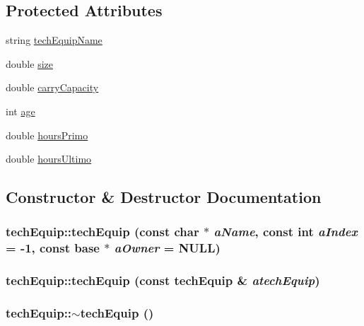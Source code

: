 \subsection*{Protected Attributes}
\begin{DoxyCompactItemize}
\item 
string \hyperlink{classtech_equip_a70f29db43df0085f1a5b8322c70e09ac}{techEquipName}
\item 
double \hyperlink{classtech_equip_a8e2d6b0d654ef641aa2bae722a926850}{size}
\item 
double \hyperlink{classtech_equip_a7abc4270ed1343782440634cc69842fc}{carryCapacity}
\item 
int \hyperlink{classtech_equip_abcca018fbc3f7fa3f12258914e1d20f7}{age}
\item 
double \hyperlink{classtech_equip_a45958baa672c3b616b5384615e7b3be8}{hoursPrimo}
\item 
double \hyperlink{classtech_equip_a33c806f6d44641789a8e919ed46e8608}{hoursUltimo}
\end{DoxyCompactItemize}


\subsection{Constructor \& Destructor Documentation}
\hypertarget{classtech_equip_abb990aaba6e93883b64ab4b60a5cf669}{
\subsubsection[{techEquip}]{\setlength{\rightskip}{0pt plus 5cm}techEquip::techEquip (const char $\ast$ {\em aName}, \/  const int {\em aIndex} = {\ttfamily -\/1}, \/  const {\bf base} $\ast$ {\em aOwner} = {\ttfamily NULL})}}
\label{classtech_equip_abb990aaba6e93883b64ab4b60a5cf669}
\hypertarget{classtech_equip_a17d3eba5034ecbb6049add3df96bf876}{
\subsubsection[{techEquip}]{\setlength{\rightskip}{0pt plus 5cm}techEquip::techEquip (const {\bf techEquip} \& {\em atechEquip})}}
\label{classtech_equip_a17d3eba5034ecbb6049add3df96bf876}
\hypertarget{classtech_equip_a602031975a6d2bd66828cc60649352fb}{
\subsubsection[{$\sim$techEquip}]{\setlength{\rightskip}{0pt plus 5cm}techEquip::$\sim$techEquip ()}}
\label{classtech_equip_a602031975a6d2bd66828cc60649352fb}


